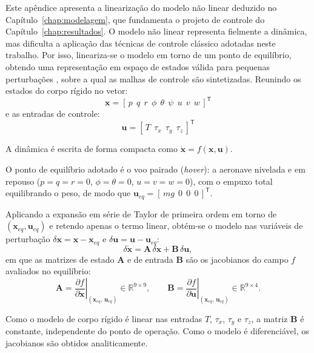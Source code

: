 Este apêndice apresenta a linearização do modelo não linear deduzido no Capítulo~\ref{chap:modelagem}, que fundamenta o projeto de controle do Capítulo~\ref{chap:resultados}. O modelo não linear representa fielmente a dinâmica, mas dificulta a aplicação das técnicas de controle clássico adotadas neste trabalho. Por isso, lineariza-se o modelo em torno de um ponto de equilíbrio, obtendo uma representação em espaço de estados válida para pequenas perturbações \cite{Beard2012}, sobre a qual as malhas de controle são sintetizadas. Reunindo os estados do corpo rígido no vetor:
\begin{equation}
  \mathbf{x} = [\,p\ \ q\ \ r\ \ \phi\ \ \theta\ \ \psi\ \ u\ \ v\ \ w\,]^{\mathsf{T}}
\end{equation}
e as entradas de controle:
\begin{equation}
  \mathbf{u} = [\,T\ \ \tau_x\ \ \tau_y\ \ \tau_z\,]^{\mathsf{T}}
\end{equation}

A dinâmica é escrita de forma compacta como $\dot{\mathbf{x}} = f(\mathbf{x}, \mathbf{u})$.

O ponto de equilíbrio adotado é o voo pairado (\textit{hover}): a aeronave nivelada e em repouso ($p=q=r=0$, $\phi=\theta=0$, $u=v=w=0$), com o empuxo total equilibrando o peso, de modo que $\mathbf{u}_{eq} = [\,mg\ \ 0\ \ 0\ \ 0\,]^{\mathsf{T}}$.

Aplicando a expansão em série de Taylor de primeira ordem em torno de $(\mathbf{x}_{eq}, \mathbf{u}_{eq})$ e retendo apenas o termo linear, obtém-se o modelo nas variáveis de perturbação $\delta\mathbf{x} = \mathbf{x} - \mathbf{x}_{eq}$ e $\delta\mathbf{u} = \mathbf{u} - \mathbf{u}_{eq}$:
\begin{equation}
    \delta\dot{\mathbf{x}} = \mathbf{A}\,\delta\mathbf{x} + \mathbf{B}\,\delta\mathbf{u},
    \label{eq:state-space}
\end{equation}
em que as matrizes de estado $\mathbf{A}$ e de entrada $\mathbf{B}$ são os jacobianos do campo $f$ avaliados no equilíbrio:
\begin{equation}
    \mathbf{A} = \left.\frac{\partial f}{\partial \mathbf{x}}\right|_{(\mathbf{x}_{eq},\,\mathbf{u}_{eq})} \in \mathbb{R}^{9\times 9},
    \qquad
    \mathbf{B} = \left.\frac{\partial f}{\partial \mathbf{u}}\right|_{(\mathbf{x}_{eq},\,\mathbf{u}_{eq})} \in \mathbb{R}^{9\times 4}.
    \label{eq:jacobianos}
\end{equation}

Como o modelo de corpo rígido é linear nas entradas $T$, $\tau_x$, $\tau_y$ e $\tau_z$, a matriz $\mathbf{B}$ é constante, independente do ponto de operação. {\color{blue}Como o modelo é diferenciável, os jacobianos são obtidos analiticamente.}

